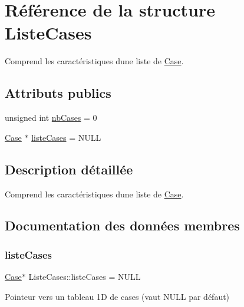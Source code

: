 \hypertarget{structListeCases}{}\section{Référence de la structure Liste\+Cases}
\label{structListeCases}


Comprend les caractéristiques d\textquotesingle{}une liste de \mbox{\hyperlink{structCase}{Case}}.  


\subsection*{Attributs publics}
\begin{DoxyCompactItemize}
\item 
unsigned int \mbox{\hyperlink{structListeCases_a9d40cea2207f78987a8977cd5c04ec69}{nb\+Cases}} = 0
\item 
\mbox{\hyperlink{structCase}{Case}} $\ast$ \mbox{\hyperlink{structListeCases_ae85417fe937a1d5d99d991affd368ff7}{liste\+Cases}} = N\+U\+LL
\end{DoxyCompactItemize}


\subsection{Description détaillée}
Comprend les caractéristiques d\textquotesingle{}une liste de \mbox{\hyperlink{structCase}{Case}}. 

\subsection{Documentation des données membres}
\mbox{\label{structListeCases_ae85417fe937a1d5d99d991affd368ff7}} 
\subsubsection{\texorpdfstring{liste\+Cases}{listeCases}}
{\footnotesize\ttfamily \mbox{\hyperlink{structCase}{Case}}$\ast$ Liste\+Cases\+::liste\+Cases = N\+U\+LL}

Pointeur vers un tableau 1D de cases (vaut N\+U\+LL par défaut) \mbox{\label{structListeCases_a9d40cea2207f78987a8977cd5c04ec69}} 
